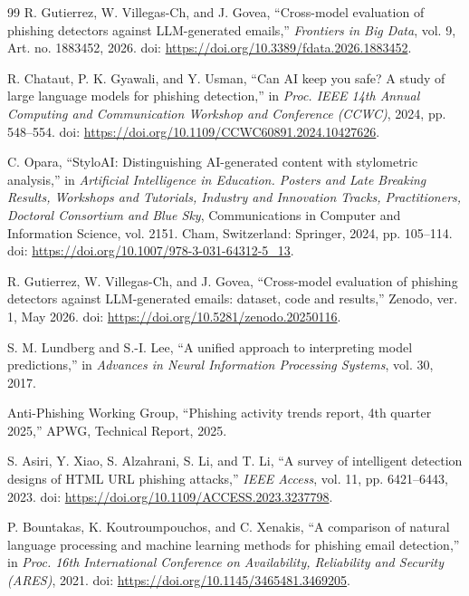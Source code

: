 \documentclass[conference]{IEEEtran}
\begin{document}
\begin{thebibliography}{99}
R. Gutierrez, W. Villegas-Ch, and J. Govea,
``Cross-model evaluation of phishing detectors against
LLM-generated emails,''
\emph{Frontiers in Big Data}, vol. 9,
Art. no. 1883452, 2026.
doi: \url{https://doi.org/10.3389/fdata.2026.1883452}.

R. Chataut, P. K. Gyawali, and Y. Usman,
``Can AI keep you safe? A study of large language models for
phishing detection,''
in \emph{Proc. IEEE 14th Annual Computing and Communication
Workshop and Conference (CCWC)}, 2024, pp. 548--554.
doi: \url{https://doi.org/10.1109/CCWC60891.2024.10427626}.

C. Opara,
``StyloAI: Distinguishing AI-generated content with stylometric analysis,''
in \emph{Artificial Intelligence in Education. Posters and Late Breaking
Results, Workshops and Tutorials, Industry and Innovation Tracks,
Practitioners, Doctoral Consortium and Blue Sky},
Communications in Computer and Information Science, vol. 2151.
Cham, Switzerland: Springer, 2024, pp. 105--114.
doi: \url{https://doi.org/10.1007/978-3-031-64312-5_13}.

R. Gutierrez, W. Villegas-Ch, and J. Govea,
``Cross-model evaluation of phishing detectors against
LLM-generated emails: dataset, code and results,''
Zenodo, ver. 1, May 2026.
doi: \url{https://doi.org/10.5281/zenodo.20250116}.

S. M. Lundberg and S.-I. Lee,
``A unified approach to interpreting model predictions,''
in \emph{Advances in Neural Information Processing Systems},
vol. 30, 2017.

Anti-Phishing Working Group,
``Phishing activity trends report, 4th quarter 2025,''
APWG, Technical Report, 2025.

S. Asiri, Y. Xiao, S. Alzahrani, S. Li, and T. Li,
``A survey of intelligent detection designs of HTML URL
phishing attacks,''
\emph{IEEE Access}, vol. 11, pp. 6421--6443, 2023.
doi: \url{https://doi.org/10.1109/ACCESS.2023.3237798}.

P. Bountakas, K. Koutroumpouchos, and C. Xenakis,
``A comparison of natural language processing and machine learning
methods for phishing email detection,''
in \emph{Proc. 16th International Conference on Availability,
Reliability and Security (ARES)}, 2021.
doi: \url{https://doi.org/10.1145/3465481.3469205}.


\end{thebibliography}
\end{document}
